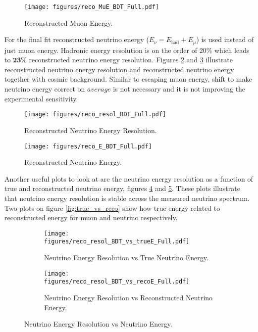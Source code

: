 \begin{figure}[!th]
\centering
\texttt{[image: figures/reco\_MuE\_BDT\_Full.pdf]}
\caption{Reconstructed Muon Energy.}
\label{fig:recoMuE}
\end{figure}

For the final fit reconstructed neutrino energy ($E_\nu = E_{\text{had}} + E_\mu$) is used instead 
of just muon energy. Hadronic energy resolution is on the order of $20\%$ which leads to 
$\textbf{23\%}$ reconstructed neutrino energy resolution. Figures \ref{fig:recoE_resol} and 
\ref{fig:recoE} illustrate reconstructed neutrino energy resolution and reconstructed neutrino
energy together with cosmic background. Similar to escaping muon energy, shift to make neutrino
energy correct on $\textit{average}$ is not necessary and it is not improving the experimental sensitivity.
\begin{figure}[!th]
\centering
\texttt{[image: figures/reco\_resol\_BDT\_Full.pdf]}
\caption{Reconstructed Neutrino Energy Resolution.}
\label{fig:recoE_resol}
\end{figure}

\begin{figure}[!th]
\centering
\texttt{[image: figures/reco\_E\_BDT\_Full.pdf]}
\caption{Reconstructed Neutrino Energy.}
\label{fig:recoE}
\end{figure}

Another useful plots to look at are the neutrino energy resolution as a function of true and reconstructed
neutrino energy, figures \ref{fig:resol_vs_trueE} and \ref{fig:resol_vs_recoE}. These plots illustrate that 
neutrino energy resolution is stable across the measured neutrino spectrum. Two plots on figure 
\ref{fig:true_vs_reco} show how true energy related to reconstructed energy for muon and neutrino respectively.
\begin{figure}[!th]
\centering
\begin{subfigure}[t]{0.95\textwidth}
  \centering
  \texttt{[image: figures/reco\_resol\_BDT\_vs\_trueE\_Full.pdf]}
  \caption{Neutrino Energy Resolution vs True Neutrino Energy.}
  \label{fig:resol_vs_trueE}
\end{subfigure}
\vspace{0.5cm}
\newline
\begin{subfigure}[t]{0.95\textwidth}
  \centering
  \texttt{[image: figures/reco\_resol\_BDT\_vs\_recoE\_Full.pdf]}
  \caption{Neutrino Energy Resolution vs Reconstructed Neutrino Energy.}
  \label{fig:resol_vs_recoE}
\end{subfigure}
\caption{ Neutrino Energy Resolution vs Neutrino Energy.}
\label{fig:resol_vs_E}
\end{figure}

